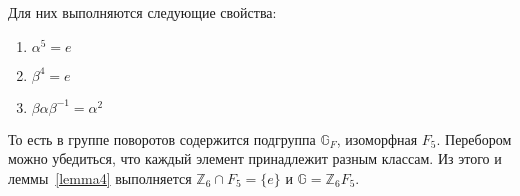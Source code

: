 \documentclass[utf8,a4paper,draft]{article}
\newtheorem{lemma_cub}{Лемма}
\newtheorem*{def_cub}{Определение}
\begin{document}
Для них выполняются следующие свойства:
\begin{enumerate}
\item $\alpha^5=e$
\item $\beta^4=e$
\item $\beta\alpha\beta^{-1}=\alpha^2$
\end{enumerate}
То есть в группе поворотов содержится подгруппа $\mathbb{G}_F$, изоморфная $F_5$. Перебором можно убедиться, что каждый элемент принадлежит разным классам. Из этого и леммы~\ref{lemma4} выполняется $\mathbb{Z}_6\cap F_5=\{e\}$ и $\mathbb{G}=\mathbb{Z}_6F_5$.
\end{document}
